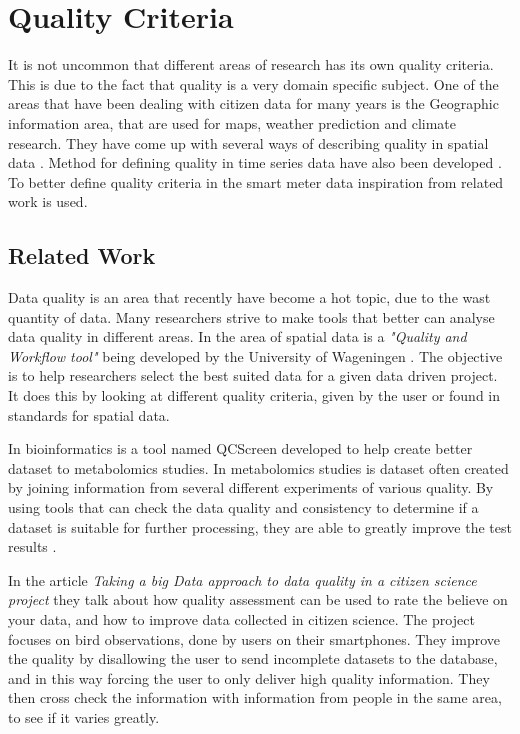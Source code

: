 \section{Quality Criteria}
It is not uncommon that different areas of research has its own quality criteria. This is due to the fact that quality is a very domain specific subject. One of the areas that have been dealing with citizen data for many years is the Geographic information area, that are used for maps, weather prediction and climate research. They have come up with several ways of describing quality in spatial data \cite{RefWorks:7}. Method for defining quality in time series data have also been developed  \cite{RefWorks:6}. To better define quality criteria in the smart meter data inspiration from related work is used.

\subsection{Related Work}
Data quality is an area that recently have become a hot topic, due to the wast quantity of data. Many researchers strive to make tools that better can analyse data quality in different areas. In the area of spatial data is a \emph{"Quality and Workflow tool"} being developed by the University of Wageningen \citep{RefWorks:8}. The objective is to help researchers select the best suited data for a given data driven project. It does this by looking at different quality criteria, given by the user or found in standards for spatial data. 

In bioinformatics is a tool named QCScreen developed to help create better dataset to metabolomics studies. In metabolomics studies is dataset often created by joining information from several different experiments of various quality. By using tools that can check the data quality and consistency to determine if a dataset is suitable for further processing, they are able to greatly improve the test results \citep{RefWorks:9}.
 
In the article \emph{Taking a big Data approach to data quality in a citizen science project}\citep{RefWorks:2} they talk about how quality assessment can be used to rate the believe on your data, and how to improve data collected in citizen science. The project focuses on bird observations, done by users on their smartphones. They improve the quality by disallowing the user to send incomplete datasets to the database, and in this way forcing the user to only deliver high quality information. They then cross check the information with information from people in the same area, to see if it varies greatly. 

